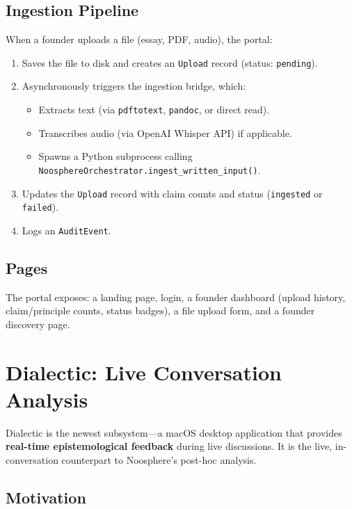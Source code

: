 \documentclass[11pt,letterpaper]{article}
\begin{document}
\subsection{Ingestion Pipeline}

When a founder uploads a file (essay, PDF, audio), the portal:

\begin{enumerate}
\item Saves the file to disk and creates an \texttt{Upload} record (status: \texttt{pending}).
\item Asynchronously triggers the ingestion bridge, which:
\begin{itemize}
\item Extracts text (via \texttt{pdftotext}, \texttt{pandoc}, or direct read).
\item Transcribes audio (via OpenAI Whisper API) if applicable.
\item Spawns a Python subprocess calling \texttt{NoosphereOrchestrator.ingest\_written\_input()}.
\end{itemize}
\item Updates the \texttt{Upload} record with claim counts and status (\texttt{ingested} or \texttt{failed}).
\item Logs an \texttt{AuditEvent}.
\end{enumerate}

\subsection{Pages}

The portal exposes: a landing page, login, a founder dashboard (upload history, claim/principle counts, status badges), a file upload form, and a founder discovery page.

\section{Dialectic: Live Conversation Analysis}

Dialectic is the newest subsystem---a macOS desktop application that provides \textbf{real-time epistemological feedback} during live discussions. It is the live, in-conversation counterpart to Noosphere's post-hoc analysis.

\subsection{Motivation}
\end{document}
